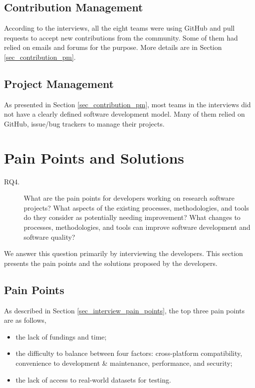 \subsection{Contribution Management}
According to the interviews, all the eight teams were using GitHub and pull requests to accept new contributions from the community. Some of them had relied on emails and forums for the purpose. More details are in Section \ref{sec_contribution_pm}.

\subsection{Project Management}
As presented in Section \ref{sec_contribution_pm}, most teams in the interviews did not have a clearly defined software development model. Many of them relied on GitHub, issue/bug trackers to manage their projects.

\section{Pain Points and Solutions}
\label{sec_rq_pain_points}
\begin{description}
\item[RQ4.] What are the pain points for developers working on research software projects? What aspects of the existing processes, methodologies, and tools do they consider as potentially needing improvement? What changes to processes, methodologies, and tools can improve software development and software quality?
\end{description}

We answer this question primarily by interviewing the developers. This section presents the pain points and the solutions proposed by the developers.

\subsection{Pain Points}
As described in Section \ref{sec_interview_pain_points}, the top three pain points are as follows,
\begin{itemize}
\item the lack of fundings and time;
\item the difficulty to balance between four factors: cross-platform compatibility, convenience to development \& maintenance, performance, and security;
\item the lack of access to real-world datasets for testing.
\end{itemize}


